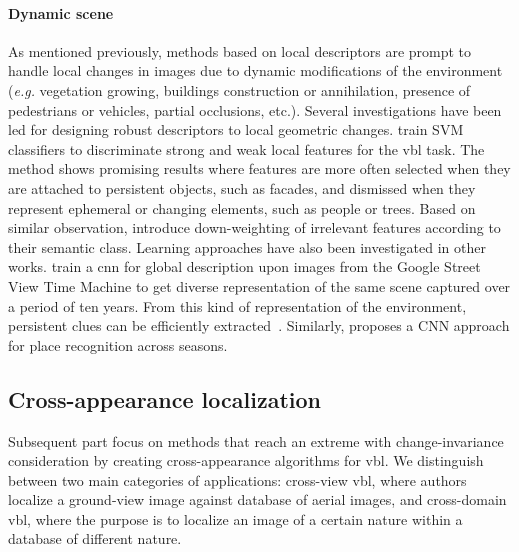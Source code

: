 		\paragraph{Dynamic scene}
			As mentioned previously, methods based on local descriptors are prompt to handle local changes in images due to dynamic modifications of the environment (\textit{e.g.} vegetation growing, buildings construction or annihilation, presence of pedestrians or vehicles, partial occlusions, etc.). Several investigations have been led for designing robust descriptors to local geometric changes. \citet{Kim2015} train SVM classifiers to discriminate strong and weak local features for the \ac{vbl} task. The method shows promising results where features are more often selected when they are attached to persistent objects, such as facades, and dismissed when they represent ephemeral or changing elements, such as people or trees. Based on similar observation, \citet{Mousavian2015} introduce down-weighting of irrelevant features according to their semantic class. Learning approaches have also been investigated in other works. \citet{Arandjelovic2017} train a \ac{cnn} for global description upon images from the Google Street View Time Machine to get diverse representation of the same scene captured over a period of ten years. From this kind of representation of the environment, persistent clues can be efficiently extracted~\citep{Neubert2015}. Similarly, \citet{Kumar2016mastersThesis} proposes a CNN approach for place recognition across seasons.

	\subsection{Cross-appearance localization}
	\label{subsec:cross_domain}
		Subsequent part focus on methods that reach an extreme with change-invariance consideration by creating cross-appearance algorithms for \ac{vbl}. We distinguish between two main categories of applications: cross-view \ac{vbl}, where authors localize a ground-view image against database of aerial images, and cross-domain \ac{vbl}, where the purpose is to localize an image of a certain nature within a database of different nature.
		
